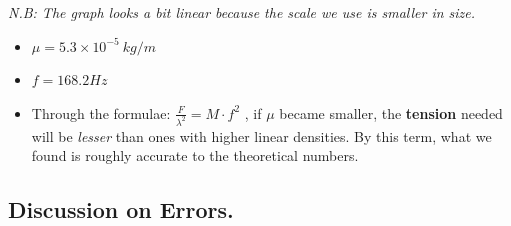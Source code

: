 \documentclass[12pt]{article}
\begin{document}
{\small
\noindent
   \textit{ N.B: The graph looks a bit linear because the scale we use is smaller in size.}
   \vspace{0.5cm}

\begin{table}[H]
\centering
{}
\caption{Observed and calculated data points for experiment (4)}
\label{tab:collision}
\end{table}
{\small
\begin{itemize}
    \item $\mu=5.3\times10^{-5}\ kg/m$
    \item $f=168.2Hz$
    \item Through the formulae: $\frac{F}{\lambda^2} = M \cdot f^2 $ , if $\mu$ became smaller, the \textbf{tension} needed will be \textit{lesser} than ones with higher linear densities. By this term, what we found is roughly accurate to the theoretical numbers.
\end{itemize}}



\subsection{\textbf{Discussion on Errors.}}

}
\end{document}
